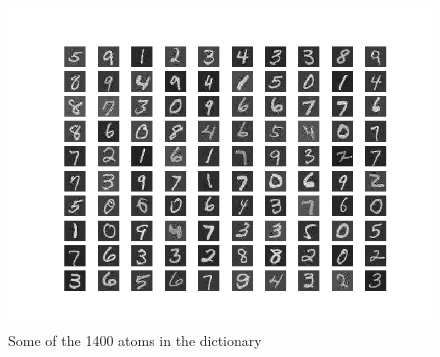 \begin{figure}[h]
 \centering
 \includegraphics[scale=0.7]{D.png}
 \caption{Some of the 1400 atoms in the dictionary}
 \label{fig:D_1400k}
\end{figure}

